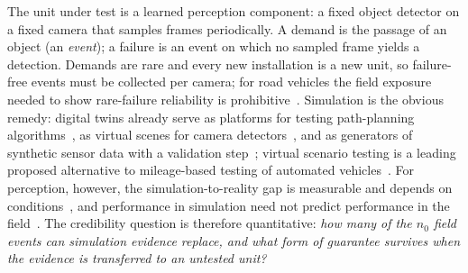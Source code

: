The unit under test is a learned perception component: a fixed object detector on a fixed camera that samples frames
periodically. A demand is the passage of an object (an \emph{event}); a failure is an event on which no sampled frame
yields a detection. Demands are rare and every new installation is a new unit, so \nNzero{} failure-free events must be
collected per camera; for road vehicles the field exposure needed to show rare-failure reliability is
prohibitive~\cite{kalra2016}. Simulation is the obvious remedy: digital twins already serve as platforms for testing
path-planning algorithms~\cite{wang2025dtplatform}, as virtual scenes for camera detectors~\cite{li2025flamedt}, and as
generators of synthetic sensor data with a validation step~\cite{nosenko2026gammadt}; virtual scenario
testing is a leading proposed alternative to mileage-based testing of automated vehicles~\cite{riedmaier2020}. For
perception, however, the simulation-to-reality gap is measurable and depends on conditions~\cite{reway2020simgap,dieter2023drone},
and performance in simulation need not predict performance in the field~\cite{kadian2020}. The credibility question
is therefore quantitative: \emph{how many of the $n_0$ field events can simulation evidence replace, and what form of
guarantee survives when the evidence is transferred to an untested unit?}

